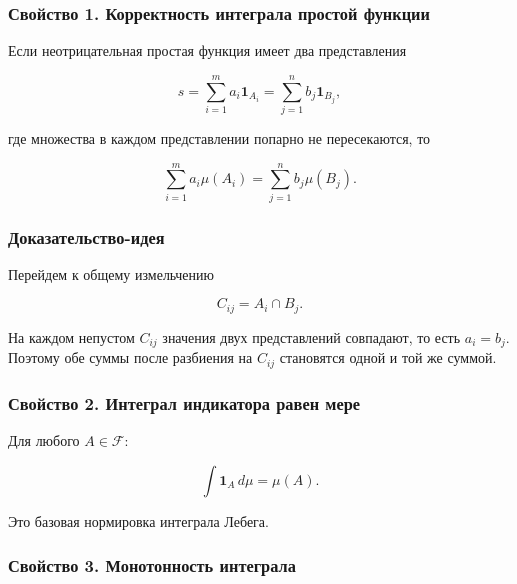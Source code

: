\documentclass[
  11pt,
  a4paper,
]{article}
\begin{document}
\subsubsection{Свойство 1. Корректность интеграла простой
функции}\label{ux441ux432ux43eux439ux441ux442ux432ux43e-1.-ux43aux43eux440ux440ux435ux43aux442ux43dux43eux441ux442ux44c-ux438ux43dux442ux435ux433ux440ux430ux43bux430-ux43fux440ux43eux441ux442ux43eux439-ux444ux443ux43dux43aux446ux438ux438}

Если неотрицательная простая функция имеет два представления

\[
s=\sum_{i=1}^m a_i\mathbf 1_{A_i}
=
\sum_{j=1}^n b_j\mathbf 1_{B_j},
\]

где множества в каждом представлении попарно не пересекаются, то

\[
\sum_{i=1}^m a_i\mu(A_i)
=
\sum_{j=1}^n b_j\mu(B_j).
\]

\subsubsection{Доказательство-идея}\label{ux434ux43eux43aux430ux437ux430ux442ux435ux43bux44cux441ux442ux432ux43e-ux438ux434ux435ux44f}

Перейдем к общему измельчению

\[
C_{ij}=A_i\cap B_j.
\]

На каждом непустом \(C_{ij}\) значения двух представлений совпадают, то
есть \(a_i=b_j\). Поэтому обе суммы после разбиения на \(C_{ij}\)
становятся одной и той же суммой.

\subsubsection{Свойство 2. Интеграл индикатора равен
мере}\label{ux441ux432ux43eux439ux441ux442ux432ux43e-2.-ux438ux43dux442ux435ux433ux440ux430ux43b-ux438ux43dux434ux438ux43aux430ux442ux43eux440ux430-ux440ux430ux432ux435ux43d-ux43cux435ux440ux435}

Для любого \(A\in\mathcal F\):

\[
\int \mathbf 1_A\,d\mu=\mu(A).
\]

Это базовая нормировка интеграла Лебега.

\subsubsection{Свойство 3. Монотонность
интеграла}\label{ux441ux432ux43eux439ux441ux442ux432ux43e-3.-ux43cux43eux43dux43eux442ux43eux43dux43dux43eux441ux442ux44c-ux438ux43dux442ux435ux433ux440ux430ux43bux430}
\end{document}
